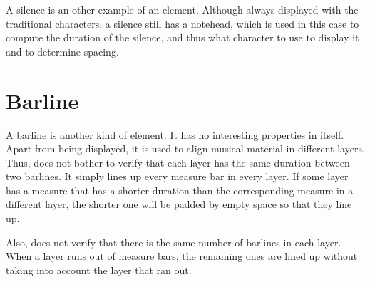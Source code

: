 A silence is an other example of an element.  Although always
displayed with the traditional characters, a silence still has a
notehead, which is used in this case to compute the duration of the
silence, and thus what character to use to display it and to determine
spacing. 

\section{Barline}

A barline is another kind of element.  It has no interesting
properties in itself.  Apart from being displayed, it is used to align
musical material in different layers.  Thus, {\gs} does not bother to
verify that each layer has the same duration between two barlines.
It simply lines up every measure bar in every layer.  If some
layer has a measure that has a shorter duration than the corresponding
measure in a different layer, the shorter one will be padded by empty
space so that they line up. 

Also, {\gs} does not verify that there is the same number of barlines
in each layer.  When a layer runs out of measure bars, the remaining
ones are lined up without taking into account the layer that ran out.
